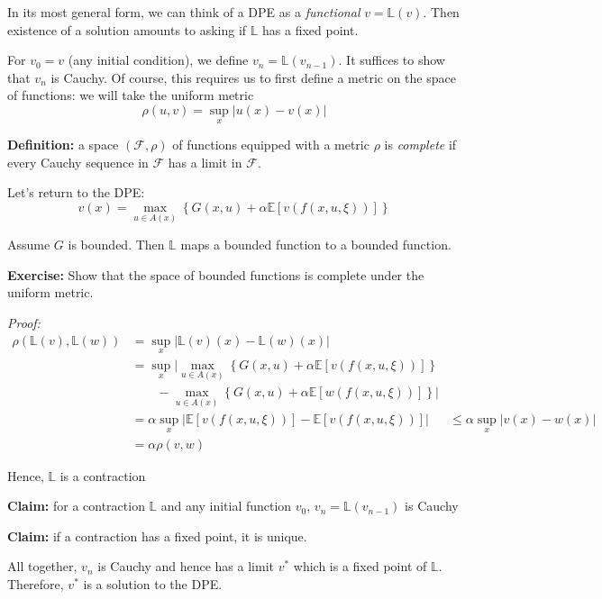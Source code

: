 \documentclass[12pt]{report}
\newcommand{\F}{\mathcal{F}}
\newcommand{\E}{\mathbb{E}}
\renewcommand{\L}{\mathbb{L}}
\newcommand{\abs}[1]{\left\vert #1 \right\vert}
\newcommand*{\tbf}[1]{\ifmmode\mathbf{#1}\else\textbf{#1}\fi}
\newenvironment*{tbox}[2][gray]{
    \begin{tcolorbox}[
        parbox=false,
        colback=#1!5!white,
        colframe=#1!75!black,
        breakable,
        title={#2}
    ]}
    {\end{tcolorbox}}
\newenvironment*{exercise}[1][red]{
    \begin{tcolorbox}[
        parbox=false,
        colback=#1!5!white,
        colframe=#1!75!black,
        breakable
    ]}
    {\end{tcolorbox}}
\begin{document}
    In its most general form, we can think of a DPE as a \emph{functional} $v = \L(v)$. Then existence of a solution amounts to asking if $\L$ has a fixed point.

    For $v_0 = v$ (any initial condition), we define $v_n = \L(v_{n-1})$. It suffices to show that $v_n$ is Cauchy. Of course, this requires us to first define a metric on the space of functions: we will take the uniform metric 
    \[\rho(u, v) = \sup_x \abs{u(x) - v(x)}\]

    \tbf{Definition:} a space $(\F, \rho)$ of functions equipped with a metric $\rho$ is \emph{complete} if every Cauchy sequence in $\F$ has a limit in $\F$. 

    Let's return to the DPE: 
    \[v(x) = \max_{u \in A(x)} \left\{G(x, u) + \alpha \E[v(f(x, u, \xi))]\right\}\]

    Assume $G$ is bounded. Then $\L$ maps a bounded function to a bounded function. 

    \begin{exercise}
        \textbf{Exercise:} Show that the space of bounded functions is complete under the uniform metric.
    \end{exercise}

    \begin{tbox}{\textbf{Claim:} $\rho(\L(v), \L(w)) \leq \alpha \rho(v, w)$ for $0 < \alpha < 1$ }
        \emph{Proof:} 
        \begin{align*}
            \rho(\L(v), \L(w)) &= \sup_x \abs{\L(v)(x) - \L(w)(x)}\\
            &= \sup_x \bigg\vert\max_{u \in A(x)} \left\{G(x, u) + \alpha \E[v(f(x, u, \xi))]\right\}\\ 
                &\qquad - \max_{u \in A(x)} \left\{G(x, u) + \alpha \E[w(f(x, u, \xi))]\right\}\bigg\vert\\
            &= \alpha \sup_x \abs{\E[v(f(x, u, \xi))] - \E[v(f(x, u, \xi))]}
            &\leq \alpha \sup_x \abs{v(x) - w(x)}\\ 
            & = \alpha \rho(v, w)
        \end{align*}

        Hence, $\L$ is a contraction
    \end{tbox}

    \tbf{Claim:} for a contraction $\L$ and any initial function $v_0$, $v_n = \L(v_{n-1})$ is Cauchy
    
    \tbf{Claim:} if a contraction has a fixed point, it is unique.

    All together, $v_n$ is Cauchy and hence has a limit $v^*$ which is a fixed point of $\L$. Therefore, $v^*$ is a solution to the DPE.
\end{document}
